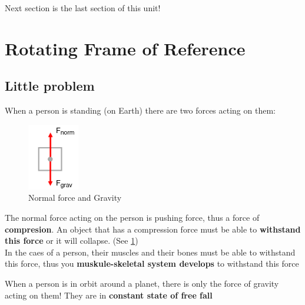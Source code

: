 Next section is the last section of this unit!

\section{Rotating Frame of Reference}
\subsection{Little problem}
When a person is standing (on Earth) there are two forces acting on them:\\

\begin{paracol}{2}
    \begin{leftcolumn}
        \begin{figure} \label{fig:2.1}
        \centering
            \includegraphics[width=0.2\textwidth]{graph/FBD2.6.1.png}
        \caption{Normal force and Gravity}
        \end{figure}
        
    \end{leftcolumn}

    \begin{rightcolumn}
        The normal force acting on the person is pushing force, thus a force of \textbf{compresion}. An object 
        that has a compression force must be able to \textbf{withstand this force} or it will collapse. (See \ref{fig:2.1})\\

        In the caes of a person, their muscles and their bones must be able to withstand this force, thus you 
        \textbf{muskule-skeletal system develops} to withstand this force
    \end{rightcolumn}
\end{paracol}

When a person is in orbit around a planet, there is only the force of gravity acting on them! They are in 
\textbf{constant state of free fall} 

